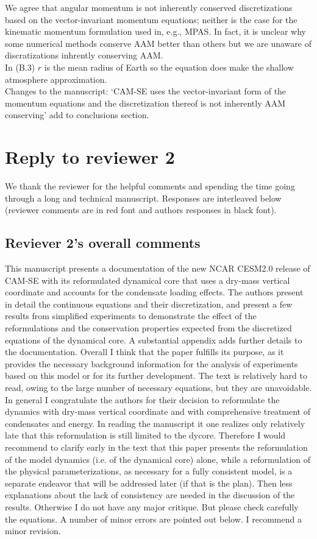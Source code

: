 \documentclass[11pt]{article}
\begin{document}
\begin{itemize}
We agree that angular momentum is not inherently conserved discretizations based on the vector-invariant momentum equations; neither is the case for the kinematic momentum formulation used in, e.g., MPAS. In fact, it is unclear why some numerical methods conserve AAM better than others \citep[see ][]{LBDL2014JAMES} but we are unaware of discratizations inhrently conserving AAM.\\

In (B.3) $r$ is the mean radius of Earth so the equation does make the shallow atmosphere approximation.\\

Changes to the manuscript: `CAM-SE uses the vector-invariant form of the momentum equations and the discretization thereof is not inherently AAM conserving' add to conclusions section.
\end{itemize}  
\newpage

\section{Reply to reviewer 2}
We thank the reviewer for the helpful comments and spending the time going through a long and technical manuscript. Responses are interleaved below (reviewer comments are in red font and authors responses in black font). 
\subsection{Reviever 2's overall comments}
This manuscript presents a documentation of the new NCAR CESM2.0 release of CAM-SE with its reformulated dynamical core that uses a dry-mass vertical coordinate and accounts for the condensate loading effects. The authors present in detail the continuous equations and their discretization, and present a few results from simplified experiments to demonstrate the effect of the reformulations and the conservation properties expected from the discretized equations of the dynamical core. A substantial appendix adds further details to the documentation. Overall I think that the paper fulfills its purpose, as it provides the necessary background information for the analysis of experiments based on this model or for its further development. The text is relatively hard to read, owing to the large number of necessary equations, but they are unavoidable.
In general I congratulate the authors for their decision to reformulate the dynamics with dry-mass vertical coordinate and with comprehensive treatment of condensates and energy. In reading the manuscript it one realizes only relatively late that this reformulation is still limited to the dycore. Therefore I would recommend to clarify early in the text that this paper presents the reformulation of the model dynamics (i.e. of the dynamical core) alone, while a reformulation of the physical parameterizations, as necessary for a fully consistent model, is a separate endeavor that will be addressed later (if that is the plan). Then less explanations about the lack of consistency are needed in the discussion of the results.
Otherwise I do not have any major critique. But please check carefully the equations. A number of minor errors are pointed out below.
I recommend a minor revision.
\end{document}
